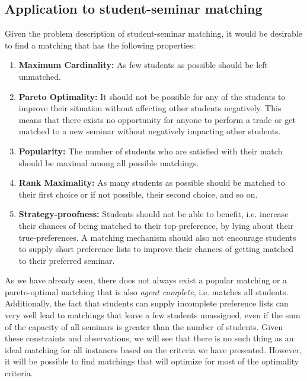 \subsection{Application to student-seminar matching}\label{criteria-application}
Given the problem description of student-seminar matching, it would be desirable to find a matching that has the following properties:
\begin{enumerate}
    \item \textbf{Maximum Cardinality:} As few students as possible should be left unmatched.
    \item \textbf{Pareto Optimality:} It should not be possible for any of the students to improve their situation without affecting other students negatively. This means that there exists no opportunity for anyone to perform a trade or get matched to a new seminar without negatively impacting other students.
    \item \textbf{Popularity:} The number of students who are satisfied with their match should be maximal among all possible matchings.
    \item \textbf{Rank Maximality:} As many students as possible should be matched to their first choice or if not possible, their second choice, and so on.
    \item \textbf{Strategy-proofness:} Students should not be able to benefit, i.e. increase their chances of being matched to their top-preference, by lying about their true-preferences. A matching mechanism should also not encourage students to supply short preference lists to improve their chances of getting matched to their preferred seminar.
\end{enumerate}
As we have already seen, there does not always exist a popular matching or a pareto-optimal matching that is also \emph{agent complete}, i.e. matches all students. Additionally, the fact that students can supply incomplete preference lists can very well lead to matchings that leave a few students unassigned, even if the sum of the capacity of all seminars is greater than the number of students. Given these constraints and observations, we will see that there is no such thing as an ideal matching for all instances based on the criteria we have presented. However, it will be possible to find matchings that will optimize for most of the optimality criteria.